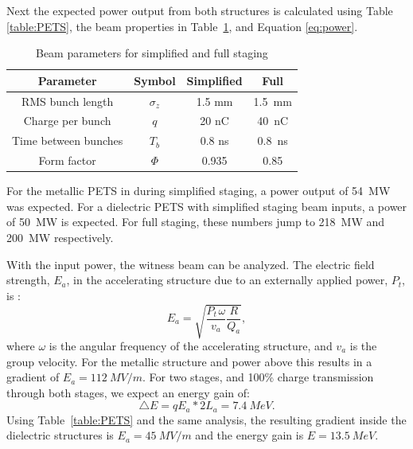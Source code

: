Next the expected power output from both structures is calculated using Table \ref{table:PETS}, 
the beam properties in Table~\ref{table:beam1}, and Equation \ref{eq:power}. 
\begin{table}
	\begin{center}
		\caption{Beam parameters for simplified and full staging}
		\label{table:beam1}
		\begin{tabular}{cccc}  
			\toprule
			\toprule
			\textbf{Parameter} & \textbf{Symbol} & \textbf{Simplified} & \textbf{Full} \\
			\midrule
			RMS bunch length & $\sigma_{z}$ & 1.5 mm & \SI{1.5}{mm}\\  
			Charge per bunch & $q$ & 20 nC & \SI{40}{nC}\\  
			Time between bunches & $T_{b}$ & 0.8 ns & \SI{0.8}{ns}\\  
			Form factor 		 & $\Phi$ & 0.935 & \SI{0.85}{}\\  
			\bottomrule
		\end{tabular}
	\end{center}
\end{table}
For the metallic PETS in during simplified staging, a power output of \SI{54}{MW} was expected.
For a dielectric PETS with simplified staging beam inputs, a power of \SI{50}{MW} is expected.
For full staging, these numbers jump to \SI{218}{MW} and \SI{200}{MW} respectively. 

With the input power, the witness beam can be analyzed. 
The electric field strength, $E_{a}$, in 
the accelerating structure due to an externally applied power,
$P_{t}$, is \cite{wangler}: 
\begin{equation}
	E_{a}=\sqrt{\frac{P_{t\,}\omega}{v_{a}}\frac{R}{Q_a}},
\label{eq:electricfield}
\end{equation}
where $\omega$ is the angular frequency of the accelerating structure,
and $v_{a}$ is the group velocity. 
  For the metallic structure and power above this results in a gradient of $E_a=\SI{112}{MV/m}$.
For two stages, and 100\% charge transmission through both stages,
we expect an energy gain of: 
\begin{equation}
\triangle E=qE_a*2L_{a}=\SI{7.4}{MeV}.
\end{equation}
Using Table~\ref{table:PETS} and the same analysis, 
the resulting gradient inside the dielectric structures is
$E_a=\SI{45}{MV/m}$ and the energy gain is $E = \SI{13.5}{MeV}$.


